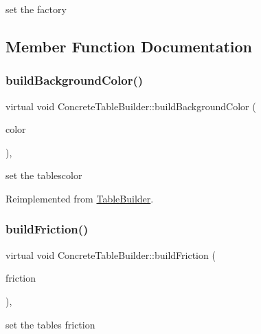 set the factory 

\subsection{Member Function Documentation}
\mbox{\label{class_concrete_table_builder_a547c26af597d109dbaf9b4de32f041a9}} 
\subsubsection{\texorpdfstring{build\+Background\+Color()}{buildBackgroundColor()}}
{\footnotesize\ttfamily virtual void Concrete\+Table\+Builder\+::build\+Background\+Color (\begin{DoxyParamCaption}\item[{Q\+String}]{color }\end{DoxyParamCaption})\hspace{0.3cm}{\ttfamily [inline]}, {\ttfamily [virtual]}}

set the table\textquotesingle{}scolor 

Reimplemented from \mbox{\hyperlink{class_table_builder_a43bfcc7fbc5c45c0e2fe579b7d7e5f9c}{Table\+Builder}}.

\mbox{\label{class_concrete_table_builder_aab2c2ff234def292f7ead072dd5fda60}} 
\subsubsection{\texorpdfstring{build\+Friction()}{buildFriction()}}
{\footnotesize\ttfamily virtual void Concrete\+Table\+Builder\+::build\+Friction (\begin{DoxyParamCaption}\item[{double}]{friction }\end{DoxyParamCaption})\hspace{0.3cm}{\ttfamily [inline]}, {\ttfamily [virtual]}}

set the table\textquotesingle{}s friction 

